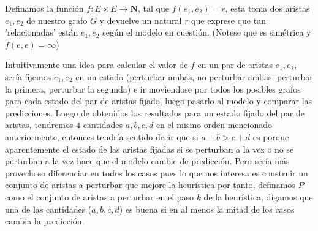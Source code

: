 \documentclass[11pt,letterpaper]{report} \usepackage[utf8]{inputenc} \usepackage[spanish]{babel}
\begin{document}
Definamos la funci\'on $f: E \times E \rightarrow \mathbf{N}$, tal que $f(e_1, e_2) = r$, esta toma dos aristas $e_1, e_2$ de nuestro grafo $G$ y devuelve un natural $r$ que exprese que tan 'relacionadas' est\'an $e_1, e_2$ seg\'un el modelo en cuesti\'on. (Notese que es sim\'etrica y $f(e, e) = \infty  $)

Intuitivamente una idea para calcular el valor de $f$ en un par de aristas $e_1, e_2$, ser\'ia fijemos $e_1, e_2$ en un estado (perturbar ambas, no perturbar ambas, perturbar la primera, perturbar la segunda) e ir moviendose por todos los posibles grafos para cada estado del par de aristas fijado, luego pasarlo al modelo y comparar las predicciones. Luego de obtenidos los resultados para un estado fijado del par de aristas, tendremos $4$ cantidades $a, b, c, d$ en el mismo orden mencionado anteriormente, entonces tendr\'ia sentido decir que si $a+b > c + d$ es porque aparentemente el estado de las aristas fijadas si se perturban a la vez o no se perturban a la vez hace que el modelo cambie de predicci\'on. Pero ser\'ia m\'as provechoso diferenciar en todos los casos pues lo que nos interesa es construir un conjunto de aristas a perturbar que mejore la heur\'istica por tanto, definamos $P$ como el conjunto de aristas a perturbar en el paso $k$ de la heur\'istica, digamos que una de las cantidades ($a,b,c,d$) es buena si en al menos la mitad de los casos cambia la predicci\'on.
\end{document}
